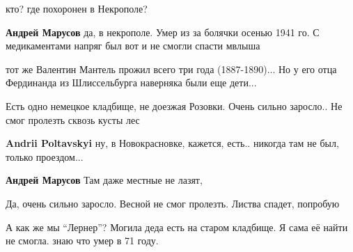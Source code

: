 \begin{itemize} %

кто? где похоронен в Некрополе?

\textbf{Андрей Марусов} да, в некрополе. Умер из за болячки осенью 1941 го. С медикаментами напряг был вот и не смогли спасти мвлыша


тот же Валентин Мантель прожил всего три года (1887-1890)... Но у его отца Фердинанда из Шлиссельбурга наверняка были еще дети...


Есть одно немецкое кладбище, не доезжая Розовки. Очень сильно заросло.. Не смог пролезть сквозь кусты лес

\textbf{Andrii Poltavskyi} ну, в Новокрасновке, кажется, есть.. никогда там не был, только проездом...

\textbf{Андрей Марусов} Там даже местные не лазят,


Да, очень сильно заросло. Весной не смог пролезть. Листва спадет, попробую
\end{itemize} %


А как же мы \enquote{Лернер}? Могила деда есть на старом кладбище. Я сама её найти не смогла. знаю что умер в 71 году.

